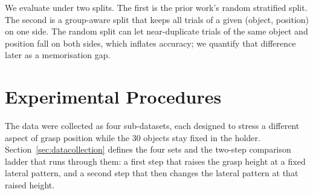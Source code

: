 \documentclass[journal]{IEEEtran}
\begin{document}
We evaluate under two splits. The first is the prior work's random stratified split. The second is a group-aware split that keeps all trials of a given (object, position) on one side. The random split can let near-duplicate trials of the same object and position fall on both sides, which inflates accuracy; we quantify that difference later as a memorisation gap.
%


\section{Experimental Procedures} %
\label{sec:Experiments}

The data were collected as four sub-datasets, each designed to stress a different aspect of grasp position while the 30 objects stay fixed in the holder. Section~\ref{sec:datacollection} defines the four sets and the two-step comparison ladder that runs through them: a first step that raises the grasp height at a fixed lateral pattern, and a second step that then changes the lateral pattern at that raised height.






\end{document}
